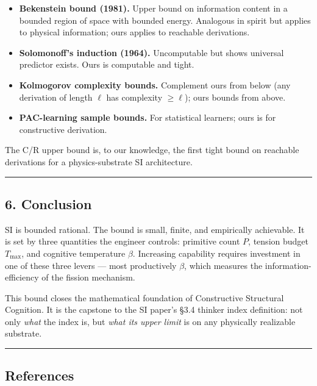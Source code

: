\documentclass[
  11pt,
  a4paper,
]{article}
\providecommand{\tightlist}{%
  \setlength{\itemsep}{0pt}\setlength{\parskip}{0pt}}
\begin{document}
\begin{itemize}
\tightlist
\item
  \textbf{Bekenstein bound (1981).} Upper bound on information content
  in a bounded region of space with bounded energy. Analogous in spirit
  but applies to physical information; ours applies to reachable
  derivations.
\item
  \textbf{Solomonoff's induction (1964).} Uncomputable but shows
  universal predictor exists. Ours is computable and tight.
\item
  \textbf{Kolmogorov complexity bounds.} Complement ours from below (any
  derivation of length \(\ell\) has complexity \(\geq \ell\)); ours
  bounds from above.
\item
  \textbf{PAC-learning sample bounds.} For statistical learners; ours is
  for constructive derivation.
\end{itemize}

The C/R upper bound is, to our knowledge, the first tight bound on
reachable derivations for a physics-substrate SI architecture.

\begin{center}\rule{0.5\linewidth}{0.5pt}\end{center}

\subsection{6. Conclusion}\label{conclusion}

SI is bounded rational. The bound is small, finite, and empirically
achievable. It is set by three quantities the engineer controls:
primitive count \(P\), tension budget \(T_\text{max}\), and cognitive
temperature \(\beta\). Increasing capability requires investment in one
of these three levers --- most productively \(\beta\), which measures
the information-efficiency of the fission mechanism.

This bound closes the mathematical foundation of Constructive Structural
Cognition. It is the capstone to the SI paper's §3.4 thinker index
definition: not only \emph{what} the index is, but \emph{what its upper
limit} is on any physically realizable substrate.

\begin{center}\rule{0.5\linewidth}{0.5pt}\end{center}

\subsection{References}\label{references}
\end{document}
